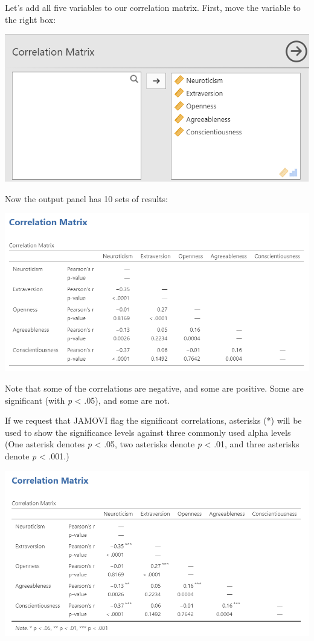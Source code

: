 \documentclass[
]{book}
\begin{document}
Let's add all five variables to our correlation matrix. First, move the variable to the right box:

\includegraphics{img/Correlation2_Variables.png}

Now the output panel has 10 sets of results:

\includegraphics{img/Correlation2_Output.png}

Note that some of the correlations are negative, and some are positive. Some are significant (with \emph{p} \textless{} .05), and some are not.

If we request that JAMOVI flag the significant correlations, asterisks (*) will be used to show the significance levels against three commonly used alpha levels (One asterisk denotes \emph{p} \textless{} .05, two asterisks denote \emph{p} \textless{} .01, and three asterisks denote \emph{p} \textless{} .001.)

\includegraphics{img/Correlation2_Output_SigFlag.png}
\end{document}
